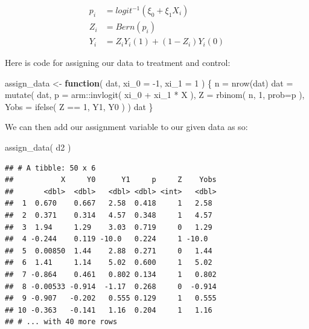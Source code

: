 \documentclass[
]{book}
\newenvironment{Shaded}{\begin{snugshade}}{\end{snugshade}}
\newcommand{\AttributeTok}[1]{\textcolor[rgb]{0.77,0.63,0.00}{#1}}
\newcommand{\ControlFlowTok}[1]{\textcolor[rgb]{0.13,0.29,0.53}{\textbf{#1}}}
\newcommand{\DecValTok}[1]{\textcolor[rgb]{0.00,0.00,0.81}{#1}}
\newcommand{\FunctionTok}[1]{\textcolor[rgb]{0.00,0.00,0.00}{#1}}
\newcommand{\NormalTok}[1]{#1}
\newcommand{\OtherTok}[1]{\textcolor[rgb]{0.56,0.35,0.01}{#1}}
\newcommand{\SpecialCharTok}[1]{\textcolor[rgb]{0.00,0.00,0.00}{#1}}
\begin{document}
\[
\begin{aligned}
p_i &= logit^{-1}( \xi_0 + \xi_1 X_i ) \\
Z_i &= Bern( p_i ) \\
Y_i &= Z_i Y_i(1) + (1-Z_i) Y_i(0) 
\end{aligned}
\]

Here is code for assigning our data to treatment and control:

\begin{Shaded}
\begin{Highlighting}[]
\NormalTok{assign\_data }\OtherTok{\textless{}{-}} \ControlFlowTok{function}\NormalTok{( dat,}
                         \AttributeTok{xi\_0 =} \SpecialCharTok{{-}}\DecValTok{1}\NormalTok{, }\AttributeTok{xi\_1 =} \DecValTok{1}\NormalTok{ ) \{}
\NormalTok{  n }\OtherTok{=} \FunctionTok{nrow}\NormalTok{(dat)}
\NormalTok{  dat }\OtherTok{=} \FunctionTok{mutate}\NormalTok{( dat,}
                \AttributeTok{p =}\NormalTok{ arm}\SpecialCharTok{::}\FunctionTok{invlogit}\NormalTok{( xi\_0 }\SpecialCharTok{+}\NormalTok{ xi\_1 }\SpecialCharTok{*}\NormalTok{ X ),}
                \AttributeTok{Z =} \FunctionTok{rbinom}\NormalTok{( n, }\DecValTok{1}\NormalTok{, }\AttributeTok{prob=}\NormalTok{p ),}
                \AttributeTok{Yobs =} \FunctionTok{ifelse}\NormalTok{( Z }\SpecialCharTok{==} \DecValTok{1}\NormalTok{, Y1, Y0 ) )}
\NormalTok{  dat}
\NormalTok{\}}
\end{Highlighting}
\end{Shaded}

We can then add our assignment variable to our given data as so:

\begin{Shaded}
\begin{Highlighting}[]
\FunctionTok{assign\_data}\NormalTok{( d2 )}
\end{Highlighting}
\end{Shaded}

\begin{verbatim}
## # A tibble: 50 x 6
##           X     Y0      Y1     p     Z    Yobs
##       <dbl>  <dbl>   <dbl> <dbl> <int>   <dbl>
##  1  0.670    0.667   2.58  0.418     1   2.58 
##  2  0.371    0.314   4.57  0.348     1   4.57 
##  3  1.94     1.29    3.03  0.719     0   1.29 
##  4 -0.244    0.119 -10.0   0.224     1 -10.0  
##  5  0.00850  1.44    2.88  0.271     0   1.44 
##  6  1.41     1.14    5.02  0.600     1   5.02 
##  7 -0.864    0.461   0.802 0.134     1   0.802
##  8 -0.00533 -0.914  -1.17  0.268     0  -0.914
##  9 -0.907   -0.202   0.555 0.129     1   0.555
## 10 -0.363   -0.141   1.16  0.204     1   1.16 
## # ... with 40 more rows
\end{verbatim}
\end{document}
